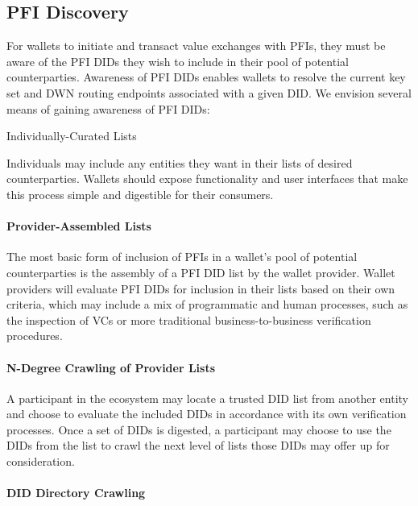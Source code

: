 \documentclass[11pt]{article}
\begin{document}
\vspace{1\baselineskip}
\subsection{PFI Discovery}

\vspace{1\baselineskip}
For wallets to initiate and transact value exchanges with PFIs, they must be aware of the PFI DIDs they wish to include in their pool of potential counterparties. Awareness of PFI DIDs enables wallets to resolve the current key set and DWN routing endpoints associated with a given DID. We envision several means of gaining awareness of PFI DIDs:

\vspace{1\baselineskip}
{\Large \textcolor[HTML]{434343}{Individually-Curated Lists}}

Individuals may include any entities they want in their lists of desired counterparties. Wallets should expose functionality and user interfaces that make this process simple and digestible for their consumers.

\paragraph{Provider-Assembled Lists}

The most basic form of inclusion of PFIs in a wallet’s pool of potential counterparties is the assembly of a PFI DID list by the wallet provider. Wallet providers will evaluate PFI DIDs for inclusion in their lists based on their own criteria, which may include a mix of programmatic and human processes, such as the inspection of VCs or more traditional business-to-business verification procedures.

\paragraph{N-Degree Crawling of Provider Lists}

A participant in the ecosystem may locate a trusted DID list from another entity and choose to evaluate the included DIDs in accordance with its own verification processes. Once a set of DIDs is digested, a participant may choose to use the DIDs from the list to crawl the next level of lists those DIDs may offer up for consideration.

\paragraph{DID Directory Crawling}
\end{document}
